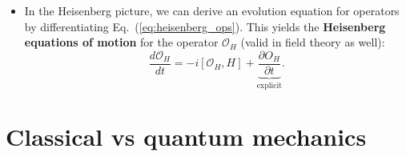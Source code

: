 \documentclass[12pt, oneside]{article}   	%
\theoremstyle{definition}
\begin{document}
\begin{itemize}
	\item In the Heisenberg picture, we can derive an evolution equation for operators by differentiating Eq.~(\ref{eq:heisenberg_ops}). This yields the \textbf{Heisenberg equations of motion} for the operator $\mathcal O_H$ (valid in field theory as well):
	\begin{equation}
		\frac{d\mathcal O_H}{dt} = -i [\mathcal O_H, H] + \underbrace{\frac{\partial O_H}{\partial t}}_{\mathrm{explicit}}.
	\end{equation}

\end{itemize}

\section*{Classical vs quantum mechanics}
\end{document}
